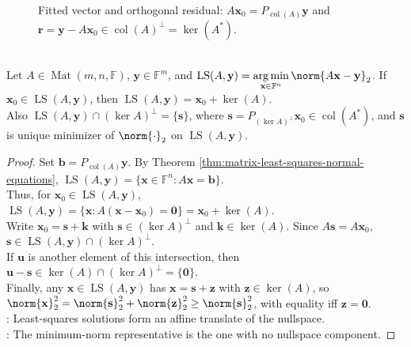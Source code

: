 \begin{figure}[H]
  \centering
  
  \caption{Fitted vector and orthogonal residual: $A\mathbf{x}_0=P_{\operatorname{col}(A)}\mathbf{y}$ and $\mathbf{r}=\mathbf{y}-A\mathbf{x}_0\in\operatorname{col}(A)^{\perp}=\ker(A^*)$.}
  \label{fig:least-squares-column-projection}
\end{figure}

\begin{proposition} \label{prop:least-squares-affine-set-and-minimum-norm} \\
Let $A\in\operatorname{Mat}(m,n,\mathbb{F})$, $\mathbf{y}\in\mathbb{F}^m$, and $\operatorname{LS}(A,\mathbf{y})=\operatorname*{arg\,min}\limits_{\mathbf{x}\in\mathbb{F}^n}\norm{A\mathbf{x}-\mathbf{y}}_2$. If $\mathbf{x}_0\in\operatorname{LS}(A,\mathbf{y})$, then $\operatorname{LS}(A,\mathbf{y})=\mathbf{x}_0+\ker(A)$.\\
Also $\operatorname{LS}(A,\mathbf{y})\cap(\ker A)^{\perp}=\{\mathbf{s}\}$, where $\mathbf{s}=P_{(\ker A)^{\perp}}\mathbf{x}_0\in\operatorname{col}(A^*)$, and $\mathbf{s}$ is unique minimizer of $\norm{\cdot}_2$ on $\operatorname{LS}(A,\mathbf{y})$.
\begin{proof}
Set $\mathbf{b}=P_{\operatorname{col}(A)}\mathbf{y}$. By Theorem \ref{thm:matrix-least-squares-normal-equations}, $\operatorname{LS}(A,\mathbf{y})=\{\mathbf{x}\in\mathbb{F}^n:A\mathbf{x}=\mathbf{b}\}$.\\
Thus, for $\mathbf{x}_0\in\operatorname{LS}(A,\mathbf{y})$, $\operatorname{LS}(A,\mathbf{y})=\{\mathbf{x}:A(\mathbf{x}-\mathbf{x}_0)=\mathbf{0}\} =\mathbf{x}_0+\ker(A)$.\\
Write $\mathbf{x}_0=\mathbf{s}+\mathbf{k}$ with $\mathbf{s}\in(\ker A)^{\perp}$ and $\mathbf{k}\in\ker(A)$. Since $A\mathbf{s}=A\mathbf{x}_0$, $\mathbf{s}\in\operatorname{LS}(A,\mathbf{y})\cap(\ker A)^{\perp}$.\\
If $\mathbf{u}$ is another element of this intersection, then $\mathbf{u}-\mathbf{s}\in\ker(A)\cap(\ker A)^{\perp}=\{\mathbf{0}\}$.\\
Finally, any $\mathbf{x}\in\operatorname{LS}(A,\mathbf{y})$ has $\mathbf{x}=\mathbf{s}+\mathbf{z}$ with $\mathbf{z}\in\ker(A)$, so $\norm{\mathbf{x}}_2^2=\norm{\mathbf{s}}_2^2+\norm{\mathbf{z}}_2^2\ge\norm{\mathbf{s}}_2^2$, with equality iff $\mathbf{z}=\mathbf{0}$.\\
: Least-squares solutions form an affine translate of the nullspace.\\
: The minimum-norm representative is the one with no nullspace component.
\end{proof}
\end{proposition}

